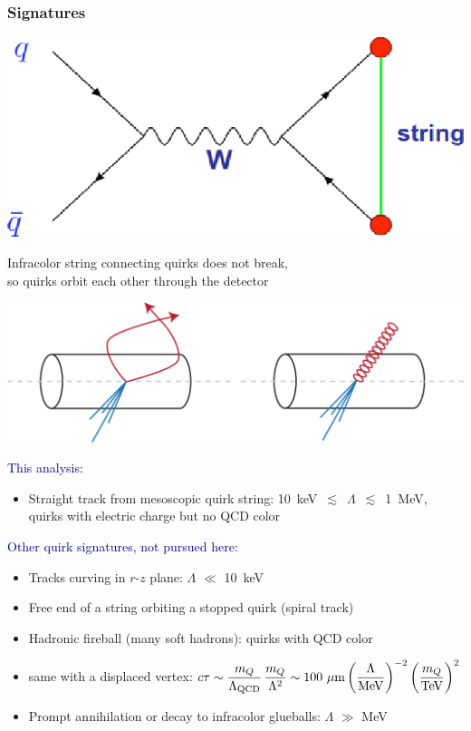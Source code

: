 \documentclass[compress]{beamer}
\newcommand{\s}[1]{{\mbox{\scriptsize #1}}}
\begin{document}
\begin{frame}
\frametitle{Signatures}

\hfill \includegraphics[width=3 cm]{diagram.png}

\vspace{-1.25 cm}
Infracolor string connecting quirks does not break, \\ so quirks orbit each other through the detector

\begin{center}
\includegraphics[width=0.7\linewidth]{weird_tracks.png}
\end{center}

\vspace{-0.5 cm}
\textcolor{darkblue}{This analysis:}
\begin{itemize}
\item Straight track from mesoscopic quirk string: \mbox{10~keV $\lesssim$ $\Lambda$ $\lesssim$ 1~MeV,\hspace{-0.5 cm}} quirks with electric charge but no QCD color
\end{itemize}

\textcolor{darkblue}{Other quirk signatures, not pursued here:}
\begin{itemize}
\item Tracks curving in $r$-$z$ plane: $\Lambda$ $\ll$ 10~keV

\item Free end of a string orbiting a stopped quirk (spiral track)

\item Hadronic fireball (many soft hadrons): quirks with QCD color

\item same with a displaced vertex: \mbox{\scriptsize $\displaystyle c\tau \sim \frac{m_Q}{\Lambda_\s{QCD}} \, \frac{m_Q}{\Lambda^2} \sim 100~\mu\mbox{m} \, \bigg(\frac{\Lambda}{\mbox{MeV}}\bigg)^{-2} \, \bigg(\frac{m_Q}{\mbox{TeV}}\bigg)^2$\hspace{-2 cm}}

\item Prompt annihilation or decay to infracolor glueballs: $\Lambda$ $\gg$ MeV
\end{itemize}
\end{frame}
\end{document}
